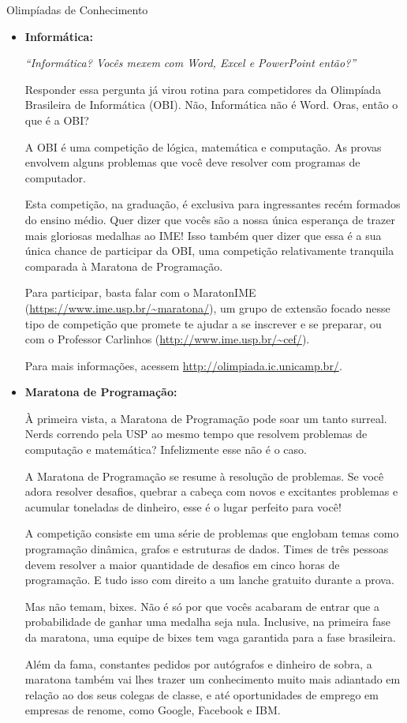 \begin{subsecao}{Olimpíadas de Conhecimento}
\begin{itemize}
\item{\bf Informática: }

\textit{``Informática? Vocês mexem com Word, Excel e PowerPoint então?''}

Responder essa pergunta já virou rotina para competidores da Olimpíada
Brasileira de Informática (OBI). Não, Informática não é Word. Oras, então o que é a OBI?

A OBI é uma competição de lógica, matemática e computação. As provas envolvem
alguns problemas que você deve resolver com programas de computador.

Esta competição, na graduação, é exclusiva para ingressantes recém formados do
ensino médio. Quer dizer que vocês são a nossa única esperança de trazer mais
gloriosas medalhas ao IME! Isso também quer dizer que essa é a sua única chance
de participar da OBI, uma competição relativamente tranquila comparada à
Maratona de Programação.

Para participar, basta falar com o MaratonIME
(\url{https://www.ime.usp.br/~maratona/}), um grupo de extensão focado nesse
tipo de competição que promete te ajudar a se inscrever e se preparar, ou com o
Professor Carlinhos (\url{http://www.ime.usp.br/~cef/}).

Para mais informações, acessem \url{http://olimpiada.ic.unicamp.br/}.

\item{\bf Maratona de Programação: }

À primeira vista, a Maratona de Programação pode soar um tanto
surreal. Nerds correndo pela USP ao mesmo tempo que resolvem
problemas de computação e matemática? Infelizmente esse não
é o caso.

A Maratona de Programação se resume à resolução de problemas.
Se você adora resolver desafios, quebrar a cabeça com novos
e excitantes problemas e acumular toneladas de dinheiro, esse
é o lugar perfeito para você!

A competição consiste em uma série de problemas que englobam
temas como programação dinâmica, grafos e estruturas de dados.
Times de três pessoas devem resolver a maior quantidade de
desafios em cinco horas de programação. E tudo isso com direito
a um lanche gratuito durante a prova.

Mas não temam, bixes. Não é só por que vocês acabaram de entrar que
a probabilidade de ganhar uma medalha seja nula. Inclusive, na primeira
fase da maratona, uma equipe de bixes tem vaga garantida para a
fase brasileira.

Além da fama, constantes pedidos por autógrafos e dinheiro de sobra,
a maratona também vai lhes trazer um conhecimento muito mais
adiantado em relação ao dos seus colegas de classe, e até oportunidades
de emprego em empresas de renome, como Google, Facebook e IBM.


\end{itemize}
\end{subsecao}
